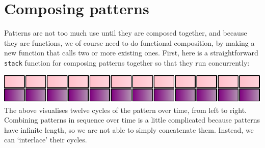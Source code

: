 \section{Composing patterns}\label{composing-patterns}

Patterns are not too much use until they are composed together, and
because they are functions, we of course need to do functional
composition, by making a new function that calls two or more existing
ones. First, here is a straightforward \texttt{stack} function for
composing patterns together so that they run concurrently:

\begin{Shaded}
\begin{Highlighting}[]
\NormalTok{ [}\NormalTok{ a] }\OtherTok{{-}\textgreater{}} 
\OtherTok{=}  \OperatorTok{$}\OtherTok{{-}\textgreater{}} \NormalTok{ (}
\end{Highlighting}
\end{Shaded}

\begin{Shaded}
\begin{Highlighting}[]
\OtherTok{=}
\end{Highlighting}
\end{Shaded}

\includegraphics{../figures/fig1.pdf}\\

The above visualises twelve cycles of the pattern over time, from left
to right. Combining patterns in sequence over time is a little
complicated because patterns have infinite length, so we are not able to
simply concatenate them. Instead, we can `interlace' their cycles.

